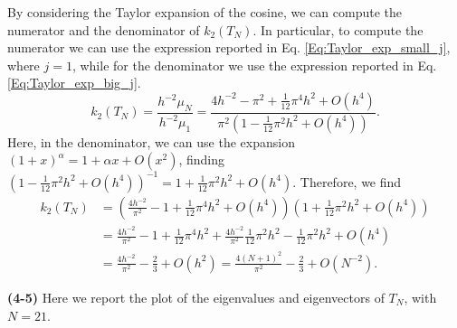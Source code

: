 \documentclass[a4paper,11pt]{article}
\begin{document}
\noindent By considering the Taylor expansion of the cosine, we can compute the numerator and the denominator of $k_2(T_N)$. In particular, to compute the numerator we can use the expression reported in Eq. \eqref{Eq:Taylor_exp_small_j}, where $j=1$, while for the denominator we use the expression reported in Eq. \eqref{Eq:Taylor_exp_big_j}.
\begin{equation}
	k_2(T_N) = \frac{h^{-2}\mu_N}{h^{-2}\mu_1} = \frac{4 h^{-2} - \pi^2 +\frac{1}{12} \pi^4 h^2 + O(h^4)}{\pi^2(1 -\frac{1}{12} \pi^2 h^2 + O(h^4))}.
\end{equation}
Here, in the denominator, we can use the expansion $ (1+x)^\alpha = 1+\alpha x + O(x^2) $, finding $ (1 -\frac{1}{12} \pi^2 h^2 + O(h^4))^{-1} = 1 + \frac{1}{12} \pi^2 h^2 + O(h^4) $. Therefore, we find
\begin{equation}\label{key}
\begin{split}
	k_2(T_N) &=\left(  \frac{4 h^{-2}}{\pi^2} - 1 +\frac{1}{12} \pi^4 h^2 + O(h^4)\right) \left( 1 + \frac{1}{12} \pi^2 h^2 + O(h^4) \right)\\
	&= \frac{4 h^{-2}}{\pi^2} - 1 +\frac{1}{12} \pi^4 h^2 + \frac{4 h^{-2}}{\pi^2} \frac{1}{12} \pi^2 h^2 -\frac{1}{12} \pi^2 h^2+ O(h^4) \\
	&= \frac{4 h^{-2}}{\pi^2} - \frac{2}{3} + O(h^2)= \frac{4 (N+1)^2}{\pi^2} - \frac{2}{3} + O(N^{-2}).
\end{split}
\end{equation}

\noindent \textbf{(4-5)} Here we report the plot of the eigenvalues and eigenvectors of $T_{N}$, with $N=21$.
\end{document}
